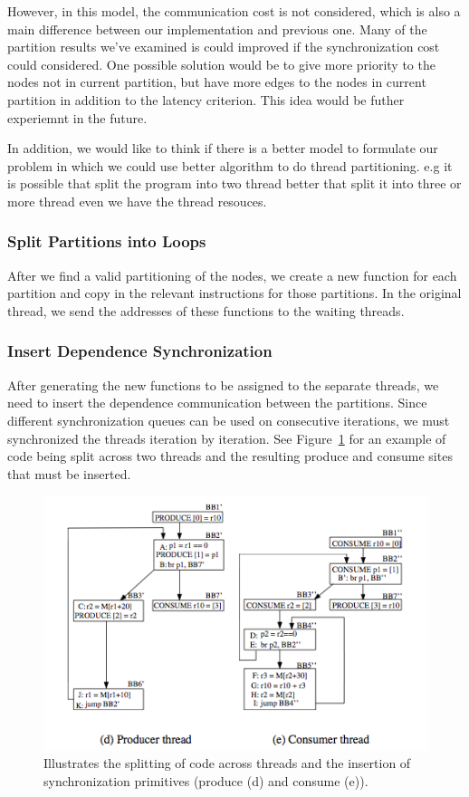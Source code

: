\documentclass[11pt, letter]{article}
\begin{document}
However, in this model, the communication cost is not considered, which is also a main difference between our implementation and previous one. Many of the partition results we've examined is could improved if the synchronization cost could considered. One possible solution would be to give more priority to the nodes not in current partition, but have more edges to the nodes in current partition in addition to the latency criterion. This idea would be futher experiemnt in the future. 

In addition, we would like to think if there is a better model to formulate our problem in which we could use better algorithm to do thread partitioning. e.g it is possible that split the program into two thread better that split it into three or more thread even we have the thread resouces.

\subsubsection{Split Partitions into Loops}
After we find a valid partitioning of the nodes, we create a new function for each partition and copy in the relevant instructions for those partitions.  In the original thread, we send the addresses of these functions to the waiting threads.

\subsubsection{Insert Dependence Synchronization}
After generating the new functions to be assigned to the separate threads, we need to insert the dependence communication between the partitions. 
 Since different synchronization queues can be used on consecutive iterations, we must synchronized the threads iteration by iteration. See Figure~\ref{sync} for an example of code being split across two threads and the resulting produce and consume sites that must be inserted.

\begin{figure}
\includegraphics[scale=0.75]{sync}
\caption{Illustrates the splitting of code across threads and the insertion of synchronization primitives (produce (d) and consume (e)).}
\label{sync}
\end{figure}
\end{document}
